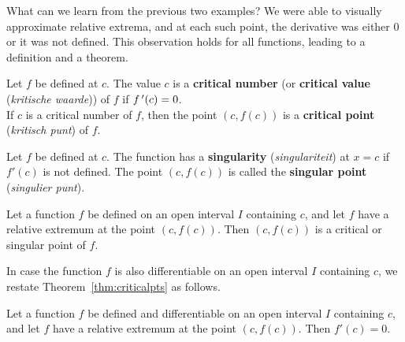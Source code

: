 What can we learn from the previous two examples? We were able to visually approximate relative extrema, and at each such point, the derivative was either 0 or it was not defined. This observation holds for all functions, leading to a definition and a theorem.

\begin{definition}\label{def:criticalnum}%
Let $f$ be defined at $c$. The value $c$ is a \textbf{critical number} (or \textbf{critical value} (\textit{kritische waarde})) of $f$ if $f\,'(c)=0$.\\
If $c$ is a critical number of $f$, then the point $(c,f(c))$ is a \textbf{critical point} (\textit{kritisch punt}) of $f$.
\end{definition}


\begin{definition}\label{def:singularnum}%
Let $f$ be defined at $c$. The function has a \textbf{singularity} (\textit{singulariteit}) at $x=c$ if $f'(c)$ is not defined. The point $(c,f(c))$ is called the \textbf{singular point} (\textit{singulier punt}).
\end{definition}


\ifanalysis\pagebreak\fi
\begin{theorem}\label{thm:criticalpts}
Let a function $f$ be defined on an open interval $I$ containing $c$, and let $f$ have a relative extremum at the point $(c,f(c))$. Then $(c,f(c))$ is a critical or singular point of $f$.
\end{theorem}

In case the function $f$ is also differentiable on an open interval $I$ containing $c$, we restate Theorem~\ref{thm:criticalpts} as follows. 

\begin{theorem}\label{fermat}
Let a function $f$ be defined and differentiable on an open interval $I$ containing $c$, and let $f$ have a relative extremum at the point $(c,f(c))$. Then $f'(c)=0$.
\end{theorem}

\ifanalysis

